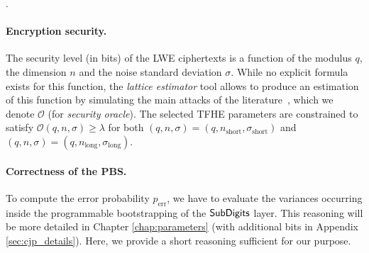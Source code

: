 \begin{table}[t!]
\centering
\caption{\gls{TFHE} Parameters used in our experiments}.
\label{tab:transistor_parameters}
\renewcommand{\arraystretch}{1.3}  %
	\end{table}



\paragraph{Encryption security.} 
The security level (in bits) of the LWE ciphertexts is a function of the modulus $q$, the dimension $n$ and the noise standard deviation $\sigma$. While no explicit formula exists for this function, the \emph{lattice estimator} tool allows to produce an estimation of this function by simulating the main attacks of the literature~\cite{lattice-estimator}, which we denote $\mathcal{O}$ (for \emph{security oracle}). The selected \gls{TFHE} parameters are constrained to satisfy $\mathcal{O}(q,n,\sigma) \geq \lambda$ for both $(q,n,\sigma) = (q,n_{\text{short}},\sigma_{\text{short}})$ and $(q,n,\sigma) = (q,n_{\text{long}},\sigma_{\text{long}})$.



\paragraph{Correctness of the \gls{PBS}.} To compute the error probability $p_{\text{err}}$, we have to evaluate the variances occurring inside the programmable bootstrapping of the $\text{\textsf{SubDigits}}$ layer. This reasoning will be more detailed in Chapter \ref{chap:parameters} (with additional bits in Appendix \ref{sec:cjp_details}). Here, we provide a short reasoning sufficient for our purpose.



